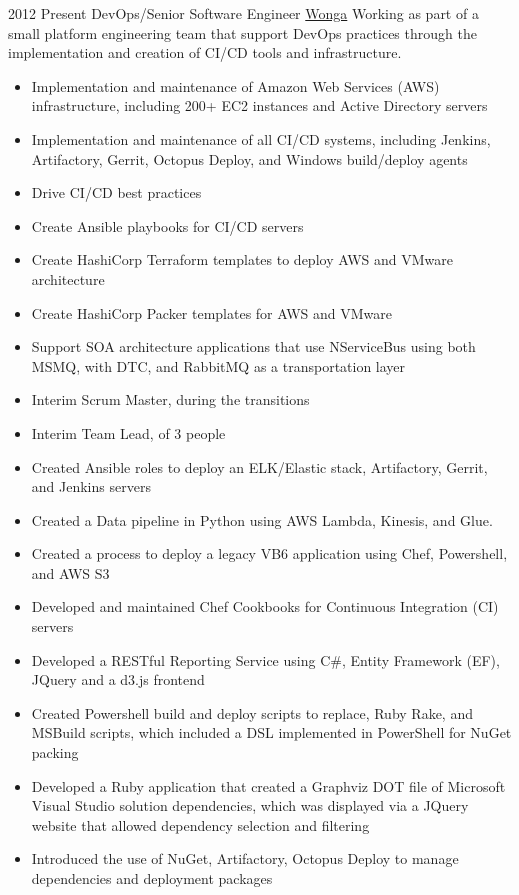 \documentclass[a4paper]{twentysecondcv} %
\begin{document}
\begin{twenty} %
\twentyitem
    	{2012}%
	{Present} %
    {DevOps/Senior Software Engineer} %
    {\href{https://www.wonga.com/}{Wonga}} %
    {Working as part of a small platform engineering team that support DevOps practices through the implementation and creation of CI/CD tools and infrastructure.} %
	{\begin{itemize}
		\item Implementation and maintenance of Amazon Web Services (AWS) infrastructure, including 200+ EC2 instances and Active Directory servers
		\item Implementation and maintenance of all CI/CD systems, including Jenkins, Artifactory, Gerrit, Octopus Deploy, and Windows build/deploy agents
		\item Drive CI/CD best practices
		\item Create Ansible playbooks for CI/CD servers
		\item Create HashiCorp Terraform templates to deploy AWS and VMware architecture
		\item Create HashiCorp Packer templates for AWS and VMware
		\item Support SOA architecture applications that use NServiceBus using both MSMQ, with DTC, and RabbitMQ as a transportation layer
		\item Interim Scrum Master, during the transitions
		\item Interim Team Lead, of 3 people
	\end{itemize}
	} %
	{\begin{itemize}
		  \item Created Ansible roles to deploy an ELK/Elastic stack, Artifactory, Gerrit, and Jenkins servers
		\item Created a Data pipeline in Python using AWS Lambda, Kinesis, and Glue.
		\item Created a process to deploy a legacy VB6 application using Chef, Powershell, and AWS S3
		\item Developed and maintained Chef Cookbooks for Continuous Integration (CI) servers
		\item Developed a RESTful Reporting Service using C\#, Entity Framework (EF), JQuery and a d3.js frontend
		\item Created Powershell build and deploy scripts to replace, Ruby Rake, and MSBuild scripts, which included a DSL implemented in PowerShell for NuGet packing
		\item Developed a Ruby application that created a Graphviz DOT file of Microsoft Visual Studio solution dependencies, which was displayed via a JQuery website that allowed dependency selection and filtering
		\item Introduced the use of NuGet, Artifactory, Octopus Deploy to manage dependencies and deployment packages
	\end{itemize}
	} %
\end{twenty}
\end{document}
